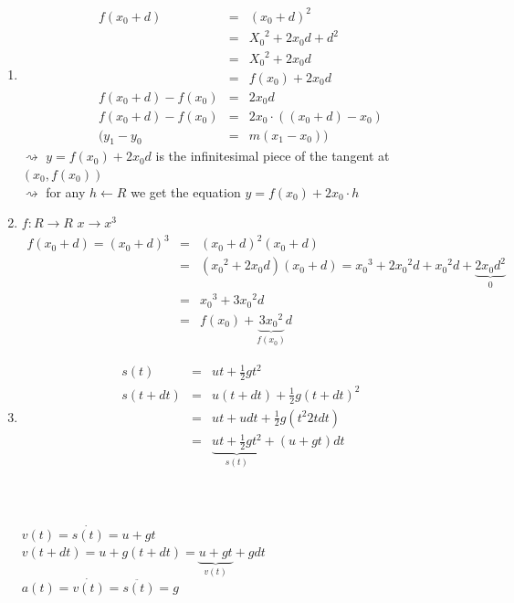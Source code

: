 \documentclass[a4paper, 12pt]{article}
\begin{document}
\begin{enumerate}
\item \begin{eqnarray*}
f(x_0+d) & =& (x_0+d)^2 \\
&=& {X_0}^2 + 2{x_0}d + d^2 \\
&=& {X_0}^2 + 2{x_0}d \\
&=& f(x_0) + 2{x_0}d \\
f(x_0+d) - f(x_0) &=&   2{x_0}d \\
f(x_0+d) - f(x_0) &=&  2{x_0}\cdot((x_0+d)-x_0) \\
(y_1 - y_0  &=& m(x_1 - x_0)) 
\end{eqnarray*}
$\rightsquigarrow$ $y = f(x_0) + 2{x_0}d $ is the infinitesimal piece of the tangent at $ (x_0,f(x_0)) $\\
$\rightsquigarrow$ for any $ h \leftarrow R $ we get the equation 
$y = f(x_0) + 2{x_0}\cdot h$
\begin{center}
\end{center}

\item 
$f:R\rightarrow R$ $x \rightarrow x^3$\\
\begin{eqnarray*}
f(x_0+d) = (x_0+d)^3 &=& (x_0+d)^2(x_0+d)\\
& = & ({x_0}^2+2{x_0}d)(x_0+d) = {x_0}^3 + 2{x_0}^2 d + {x_0}^2 d + \underbrace{2{x_0}d^2}_{0}\\
& = &{x_0}^3 + 3{x_0}^2 d \\
& = & f(x_0) + \underbrace{3{x_0}^2}_{f(x_0)}d
\end{eqnarray*}
\item
\begin{eqnarray*}
s(t) &=& ut + \frac{1}{2}gt^2\\
s(t+dt) &=& u(t+dt) + \frac{1}{2}g(t+dt)^2\\
& = & ut + udt +  \frac{1}{2}g(t^2 2tdt)\\
& = & \underbrace{ut + \frac{1}{2}gt^2}_{s(t)} + (u+gt)dt\\
\end{eqnarray*}
\\
\\
\begin{centering}
$v(t) = \dot{s(t)}= u + gt$\\
$v(t + dt) = u + g(t+dt) = \underbrace{u + gt}_{v(t)} + gdt$\\
$a(t) = \dot{v(t)} = \ddot{s(t)} = g$\\
\end{centering}
\end{enumerate}
\end{document}
